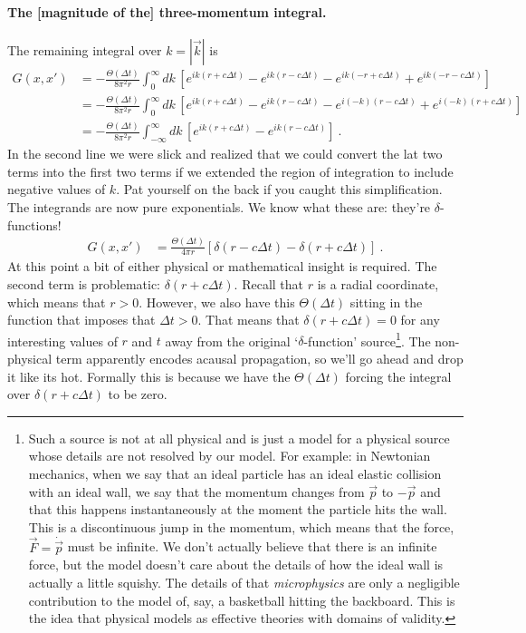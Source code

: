 \paragraph{The [magnitude of the] three-momentum integral.} The remaining integral over $k=|\vec k|$ is
\begin{align}
	G(x,x')&= -
	\frac{\Theta(\Delta t)}{8\pi^2 r} 
	\int^\infty_0
	dk\, 
	\left[
 		e^{ik(r+c\Delta t)}
 		- e^{ik(r-c\Delta t)}
 		- e^{ik(-r+c\Delta t)}
 		+ e^{ik(-r-c\Delta t)}
	\right] 
	\\
	&= -
	\frac{\Theta(\Delta t)}{8\pi^2 r} 
	\int^\infty_0
	dk\, 
	\left[
 		e^{ik(r+c\Delta t)}
 		- e^{ik(r-c\Delta t)}
 		- e^{i(-k)(r-c\Delta t)}
 		+ e^{i(-k)(r+c\Delta t)}
	\right] 
	\\
	&= -
	\frac{\Theta(\Delta t)}{8\pi^2 r} 
	\int^\infty_{-\infty}
	dk\, 
	\left[
 		e^{ik(r+c\Delta t)}
 		- e^{ik(r-c\Delta t)}
	\right] 
	\ .
\end{align}
In the second line we were slick and realized that we could convert the lat two terms into the first two terms if we extended the region of integration to include negative values of $k$. Pat yourself on the back if you caught this simplification. The integrands are now pure exponentials. We know what these are: they're $\delta$-functions!
\begin{align}
	G(x,x')
	&=
	\frac{\Theta(\Delta t)}{4\pi r} 
	\left[ \delta(r-c\Delta t) - \delta(r+c\Delta t) \right]
	\ .
\end{align}
At this point a bit of either physical or mathematical insight is required. The second term is problematic: $\delta(r+c\Delta t)$. Recall that $r$ is a radial coordinate, which means that $r>0$. However, we also have this $\Theta(\Delta t)$ sitting in the function that imposes that $\Delta t > 0$. That means that $\delta(r+c\Delta t) = 0$ for any interesting values of $r$ and $t$ away from the original `$\delta$-function' source\footnote{Such a source is not at all physical and is just a model for a physical source whose details are not resolved by our model. For example: in Newtonian mechanics, when we say that an ideal particle has an ideal elastic collision with an ideal wall, we say that the momentum changes from $\vec{p}$ to $-\vec{p}$ and that this happens instantaneously at the moment the particle hits the wall. This is a discontinuous jump in the momentum, which means that the force, $\vec{F} = \dot{\vec{p}}$ must be infinite. We don't actually believe that there is an infinite force, but the model doesn't care about the details of how the ideal wall is actually a little squishy. The details of that \emph{microphysics} are only a negligible contribution to the model of, say, a basketball hitting the backboard. This is the idea that physical models as effective theories with domains of validity.}. The non-physical term apparently encodes acausal propagation, so we'll go ahead and drop it like its hot. Formally this is because we have the $\Theta(\Delta t)$ forcing the integral over $\delta(r+c\Delta t)$ to be zero.

